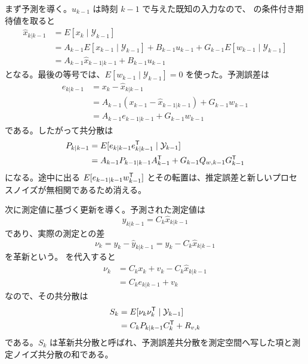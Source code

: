 まず予測を導く。$u_{k-1}$ は時刻 $k-1$ で与えた既知の入力なので、 の条件付き期待値を取ると
\begin{align}
  \hat{x}_{k|k-1}
  &=E[x_k\mid\mathcal{Y}_{k-1}]\\
  &=A_{k-1}E[x_{k-1}\mid\mathcal{Y}_{k-1}]+B_{k-1}u_{k-1}
    +G_{k-1}E[w_{k-1}\mid\mathcal{Y}_{k-1}]\\
  &=A_{k-1}\hat{x}_{k-1|k-1}+B_{k-1}u_{k-1}
\end{align}
となる。最後の等号では、$E[w_{k-1}\mid\mathcal{Y}_{k-1}]=0$ を使った。予測誤差は
\begin{align}
  e_{k|k-1}
  &=x_k-\hat{x}_{k|k-1}\\
  &=A_{k-1}(x_{k-1}-\hat{x}_{k-1|k-1})+G_{k-1}w_{k-1}\\
  &=A_{k-1}e_{k-1|k-1}+G_{k-1}w_{k-1}
\end{align}
である。したがって共分散は
\begin{align}
  P_{k|k-1}
  &=E[e_{k|k-1}e_{k|k-1}^{\mathsf{T}}\mid\mathcal{Y}_{k-1}]\\
  &=A_{k-1}P_{k-1|k-1}A_{k-1}^{\mathsf{T}}+G_{k-1}Q_{w,k-1}G_{k-1}^{\mathsf{T}}
\end{align}
になる。途中に出る $E[e_{k-1|k-1}w_{k-1}^{\mathsf{T}}]$ とその転置は、推定誤差と新しいプロセスノイズが無相関であるため消える。

次に測定値に基づく更新を導く。予測された測定値は
\begin{equation}
  \hat{y}_{k|k-1}=C_k\hat{x}_{k|k-1}
\end{equation}
であり、実際の測定との差
\begin{equation}
  \nu_k=y_k-\hat{y}_{k|k-1}=y_k-C_k\hat{x}_{k|k-1}
\end{equation}
を革新という。 を代入すると
\begin{align}
  \nu_k
  &=C_kx_k+v_k-C_k\hat{x}_{k|k-1}\\
  &=C_ke_{k|k-1}+v_k
\end{align}
なので、その共分散は
\begin{align}
  S_k
  &=E[\nu_k\nu_k^{\mathsf{T}}\mid\mathcal{Y}_{k-1}]\\
  &=C_kP_{k|k-1}C_k^{\mathsf{T}}+R_{v,k}
\end{align}
である。$S_k$ は革新共分散と呼ばれ、予測誤差共分散を測定空間へ写した項と測定ノイズ共分散の和である。

